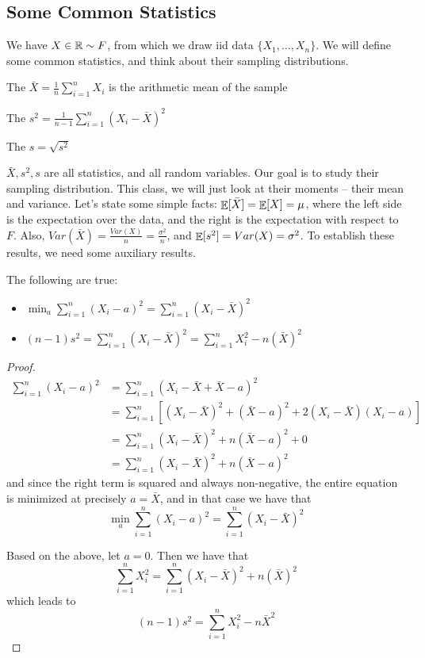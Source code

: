 \documentclass[10pt]{article}
\begin{document}
\subsection{Some Common Statistics}

We have $X \in \mathbb{R} \sim F$, from which we draw iid data $\{X_1,\dots,X_n\}$. We will define some common statistics, and think about their sampling distributions.

\begin{definition}
	The  $\bar{X} = \frac{1}{n} \sum_{i=1}^n X_i$ is the arithmetic mean of the sample
\end{definition}

\begin{definition}
	The  $s^2 = \frac{1}{n-1} \sum_{i=1}^n (X_i - \bar{X})^2$
\end{definition}

\begin{definition}
	The  $s = \sqrt{s^2}$
\end{definition}

$\bar{X}, s^2, s$ are all statistics, and all random variables. Our goal is to study their sampling distribution. This class, we will just look at their moments -- their mean and variance. Let's state some simple facts: $\mathop{\mathbb{E}}[\bar{X}] = \mathop{\mathbb{E}}[X] = \mu$, where the left side is the expectation over the data, and the right is the expectation with respect to $F$. Also, $Var(\bar{X}) = \frac{Var(X)}{n} = \frac{\sigma^2}{n}$, and $\mathop{\mathbb{E}}[s^2] = Var(X) = \sigma^2$. To establish these results, we need some auxiliary results.


\begin{theorem}
	The following are true:
	\begin{itemize}
		\item $\min_a \sum_{i=1}^n (X_i - a)^2 = \sum_{i=1}^n (X_i - \bar{X})^2$
		\item $(n-1)s^2 = \sum_{i=1}^n (X_i - \bar{X})^2 = \sum_{i=1}^n X_i^2 - n(\bar{X})^2$
	\end{itemize}
\end{theorem}
\begin{proof}
	\begin{align*}
	\sum_{i=1}^n (X_i - a)^2 &= \sum_{i=1}^n (X_i - \bar{X} + \bar{X} - a)^2\\
	&= \sum_{i=1}^n \left[(X_i - \bar{X})^2 + (\bar{X} - a)^2 + 2(X_i - \bar{X})(X_i - a) \right] \\
	&= \sum_{i=1}^n (X_i - \bar{X})^2 + n(\bar{X} - a)^2 + 0 \\
	&= \sum_{i=1}^n (X_i - \bar{X})^2 + n(\bar{X} - a)^2
	\end{align*}
	and since the right term is squared and always non-negative, the entire equation is minimized at precisely $a = \bar{X}$, and in that case we have that
	\[
	\min_a \sum_{i=1}^n (X_i - a)^2 = \sum_{i=1}^n (X_i - \bar{X})^2
	\]
	
	Based on the above, let $a = 0$. Then we have that
	\[
	\sum_{i=1}^n X_i^2 = \sum_{i=1}^n (X_i - \bar{X})^2 + n (\bar{X})^2
	\]
	which leads to
	\[
	(n-1)s^2 = \sum_{i=1}^n X_i^2 - n \bar{X}^2
	\]
\end{proof}
\end{document}
